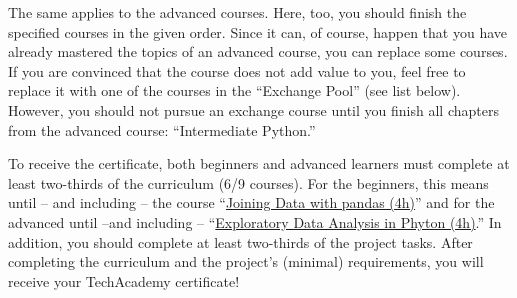 \documentclass[
  11pt,
]{article}
\begin{document}
The same applies to the advanced courses.
Here, too, you should finish the specified courses in the given order.
Since it can, of course, happen that you have already mastered the topics of an advanced course, you can replace some courses.
If you are convinced that the course does not add value to you, feel free to replace it with one of the courses in the ``Exchange Pool'' (see list below).
However, you should not pursue an exchange course until you finish all chapters from the advanced course: ``Intermediate Python.''

To receive the certificate, both beginners and advanced learners must complete at least two-thirds of the curriculum (6/9 courses).
For the beginners, this means until -- and including -- the course ``\href{https://www.datacamp.com/courses/joining-data-with-pandas}{Joining Data with pandas (4h)}'' and for the advanced until --and including -- ``\href{https://learn.datacamp.com/courses/exploratory-data-analysis-in-python}{Exploratory Data Analysis in Phyton (4h)}.'' In addition, you should complete at least two-thirds of the project tasks.
After completing the curriculum and the project's (minimal) requirements, you will receive your TechAcademy certificate!
\end{document}
